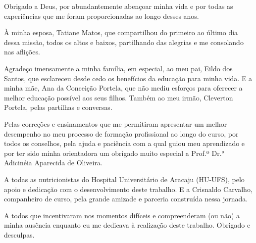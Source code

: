 \begin{agradecimentos}

Obrigado a Deus, por abundantemente abençoar minha vida e por todas as experiências que me foram proporcionadas ao longo desses anos.

À minha esposa, Tatiane Matos, que compartilhou do primeiro ao último dia dessa missão, todos os altos e baixos, partilhando das alegrias e me consolando nas aflições. 

Agradeço imensamente a minha família, em especial, ao meu pai, Eildo dos Santos, que esclareceu desde cedo os benefícios da educação para minha vida. E a minha mãe, Ana da Conceição Portela, que não mediu esforços para oferecer a melhor educação possível aos seus filhos. Também ao meu irmão, Cleverton Portela, pelas partilhas e conversas. 

Pelas correções e ensinamentos que me permitiram apresentar um melhor desempenho no meu processo de formação profissional ao longo do curso, por todos os conselhos, pela ajuda e paciência com a qual guiou meu aprendizado e por ter sido minha orientadora um obrigado muito especial a Prof.ª Dr.° Adicinéia Aparecida de Oliveira.

A todas as nutricionistas do Hospital Universitário de Aracaju (HU-UFS), pelo apoio e dedicação com o desenvolvimento deste trabalho. E a Crisnaldo Carvalho, companheiro de curso, pela grande amizade e parceria construída nessa jornada.

A todos que incentivaram nos momentos difíceis e compreenderam (ou não) a minha ausência enquanto eu me dedicava à realização deste trabalho. Obrigado e desculpas.

\end{agradecimentos}
